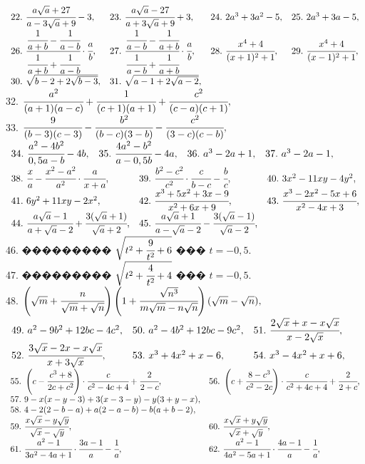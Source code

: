 \documentclass[12pt]{article}
\begin{document}
$\begin{array}{llll}
22.\ \cfrac{a\sqrt{a}+27}{a-3\sqrt{a}+9}-3,&
23.\ \cfrac{a\sqrt{a}-27}{a+3\sqrt{a}+9}+3,&
24.\ 2a^3+3a^2-5,&
25.\ 2a^3+3a-5,\\
26.\ \cfrac{\cfrac{1}{a+b}-\cfrac{1}{a-b}}{\cfrac{1}{a+b}+\cfrac{1}{a-b}}\cdot\cfrac{a}{b},&
27.\ \cfrac{\cfrac{1}{a-b}-\cfrac{1}{a+b}}{\cfrac{1}{a-b}+\cfrac{1}{a+b}}\cdot\cfrac{a}{b},&
28.\ \cfrac{x^4+4}{(x+1)^2+1},&
29.\ \cfrac{x^4+4}{(x-1)^2+1},\\
30.\ \sqrt{b-2+2\sqrt{b-3}},&
31.\ \sqrt{a-1+2\sqrt{a-2}},
\end{array}$\\
32. $\cfrac{a^2}{(a+1)(a-c)}+\cfrac{1}{(c+1)(a+1)}+\cfrac{c^2}{(c-a)(c+1)},$\\
33. $\cfrac{9}{(b-3)(c-3)}-\cfrac{b^2}{(b-c)(3-b)}-\cfrac{c^2}{(3-c)(c-b)},$\\
$\begin{array}{llll}
34.\ \cfrac{a^2-4b^2}{0,5a-b}-4b,&
35.\ \cfrac{4a^2-b^2}{a-0,5b}-4a,&
36.\ a^3-2a+1,&
37.\ a^3-2a-1,\end{array}$\\ $\begin{array}{lll}
38.\ \cfrac{x}{a}-\cfrac{x^2-a^2}{a^2}\cdot\cfrac{a}{x+a},&
39.\ \cfrac{b^2-c^2}{c^2}\cdot\cfrac{c}{b-c}-\cfrac{b}{c},&
40.\ 3x^2-11xy-4y^2,\\
41.\ 6y^2+11xy-2x^2,&
42.\ \cfrac{x^3+5x^2+3x-9}{x^2+6x+9},&
43.\ \cfrac{x^3-2x^2-5x+6}{x^2-4x+3},\\
44.\ \cfrac{a\sqrt{a}-1}{a+\sqrt{a}-2}+\cfrac{3(\sqrt{a}+1)}{\sqrt{a}+2},&
45.\ \cfrac{a\sqrt{a}+1}{a-\sqrt{a}-2}-\cfrac{3(\sqrt{a}-1)}{\sqrt{a}-2},
\end{array}$\\
46. ��������� $\sqrt{t^2+\cfrac{9}{t^2}+6}$ ��� $t=-0,5.$\\
47. ��������� $\sqrt{t^2+\cfrac{4}{t^2}+4}$ ��� $t=-0,5.$\\
48. $\left(\sqrt{m}+\cfrac{n}{\sqrt{m}+\sqrt{n}}\right)\left(1+\cfrac{\sqrt{n^3}}{m\sqrt{m}-n\sqrt{n}}\right)(
\sqrt{m}-\sqrt{n}),$\\
$\begin{array}{llll}
49.\ a^2-9b^2+12bc-4c^2,&
50.\ a^2-4b^2+12bc-9c^2,&
51.\ \cfrac{2\sqrt{x}+x-x\sqrt{x}}{x-2\sqrt{x}},\\
52.\ \cfrac{3\sqrt{x}-2x-x\sqrt{x}}{x+3\sqrt{x}},&
53.\ x^3+4x^2+x-6,&
54.\ x^3-4x^2+x+6,\end{array}$\\ $\begin{array}{ll}
55.\ \left(c-\cfrac{c^3+8}{2c+c^2}\right)\cdot\cfrac{c}{c^2-4c+4}+\cfrac{2}{2-c},&
56.\ \left(c+\cfrac{8-c^3}{c^2-2c}\right)\cdot\cfrac{c}{c^2+4c+4}+\cfrac{2}{2+c},\\
57.\ 9-x(x-y-3)+3(x-3-y)-y(3+y-x),\\
58.\ 4-2(2-b-a)+a(2-a-b)-b(a+b-2),\\
59.\ \cfrac{x\sqrt{x}-y\sqrt{y}}{\sqrt{x}-\sqrt{y}},&
60.\ \cfrac{x\sqrt{x}+y\sqrt{y}}{\sqrt{x}+\sqrt{y}},\\
61.\ \cfrac{a^2-1}{3a^2-4a+1}\cdot\cfrac{3a-1}{a}-\cfrac{1}{a},&
62.\ \cfrac{a^2-1}{4a^2-5a+1}\cdot\cfrac{4a-1}{a}-\cfrac{1}{a},
\end{array}$\\
\end{document}
